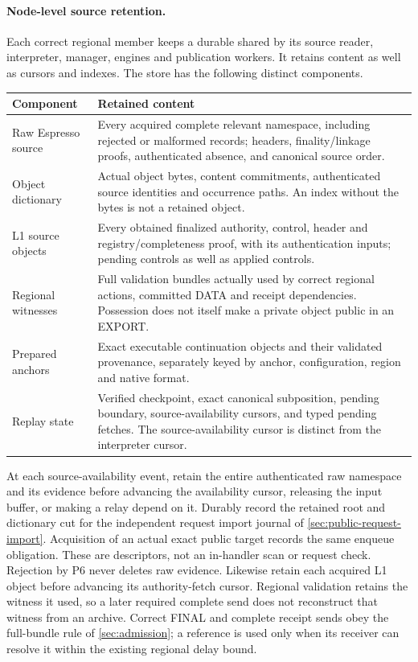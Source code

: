 \paragraph{Node-level source retention.}
\label{sec:source-step}
\label{sec:source-retention}
Each correct regional member keeps a durable  shared
by its source reader, interpreter, manager, engines and publication
workers. It retains content as well as cursors and indexes. The store
has the following distinct components.
\begin{table}[htbp]\centering\small
\begin{tabularx}{\linewidth}{@{}>{\raggedright\arraybackslash}p{.24\linewidth}Y@{}}\toprule
Component & Retained content\\\midrule
Raw Espresso source & Every acquired complete relevant namespace,
including rejected or malformed records; headers, finality/linkage
proofs, authenticated absence, and canonical source order.\\
Object dictionary & Actual object bytes, content commitments,
authenticated source identities and occurrence paths. An index without
the bytes is not a retained object.\\
L1 source objects & Every obtained finalized authority, control,
header and registry/completeness proof, with its authentication inputs;
pending controls as well as applied controls.\\
Regional witnesses & Full validation bundles actually used by correct
regional actions, committed DATA and receipt dependencies. Possession
does not itself make a private object public in an EXPORT.\\
Prepared anchors & Exact executable continuation objects and their
validated provenance, separately keyed by anchor, configuration,
region and native format.\\
Replay state & Verified checkpoint, exact canonical subposition,
pending boundary, source-availability cursors, and typed pending fetches.
The source-availability cursor is distinct from the interpreter cursor.\\\bottomrule
\end{tabularx}
\end{table}

At each source-availability event, retain the entire authenticated raw
namespace and its evidence before advancing the availability cursor,
releasing the input buffer, or making a relay depend on it. Durably
record the retained root and dictionary cut for the independent request
import journal of \cref{sec:public-request-import}. Acquisition of an
actual exact public target records the same enqueue obligation. These
are descriptors, not an in-handler scan or request check. Rejection
by P6 never deletes raw evidence. Likewise retain each acquired L1
object before advancing its authority-fetch cursor. Regional validation
retains the witness it used, so a later required complete send does not
reconstruct that witness from an archive. Correct FINAL and complete
receipt sends obey the full-bundle rule of \cref{sec:admission}; a
reference is used only when its receiver can resolve it within the
existing regional delay bound.

